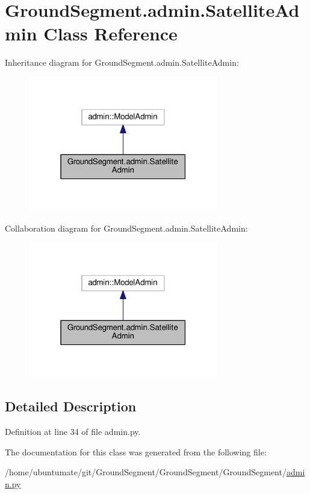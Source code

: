 \hypertarget{class_ground_segment_1_1admin_1_1_satellite_admin}{}\section{Ground\+Segment.\+admin.\+Satellite\+Admin Class Reference}
\label{class_ground_segment_1_1admin_1_1_satellite_admin}


Inheritance diagram for Ground\+Segment.\+admin.\+Satellite\+Admin\+:\nopagebreak
\begin{figure}[H]
\begin{center}
\leavevmode
\includegraphics[width=235pt]{class_ground_segment_1_1admin_1_1_satellite_admin__inherit__graph}
\end{center}
\end{figure}


Collaboration diagram for Ground\+Segment.\+admin.\+Satellite\+Admin\+:\nopagebreak
\begin{figure}[H]
\begin{center}
\leavevmode
\includegraphics[width=235pt]{class_ground_segment_1_1admin_1_1_satellite_admin__coll__graph}
\end{center}
\end{figure}


\subsection{Detailed Description}


Definition at line 34 of file admin.\+py.



The documentation for this class was generated from the following file\+:\begin{DoxyCompactItemize}
\item 
/home/ubuntumate/git/\+Ground\+Segment/\+Ground\+Segment/\+Ground\+Segment/\hyperlink{admin_8py}{admin.\+py}\end{DoxyCompactItemize}
